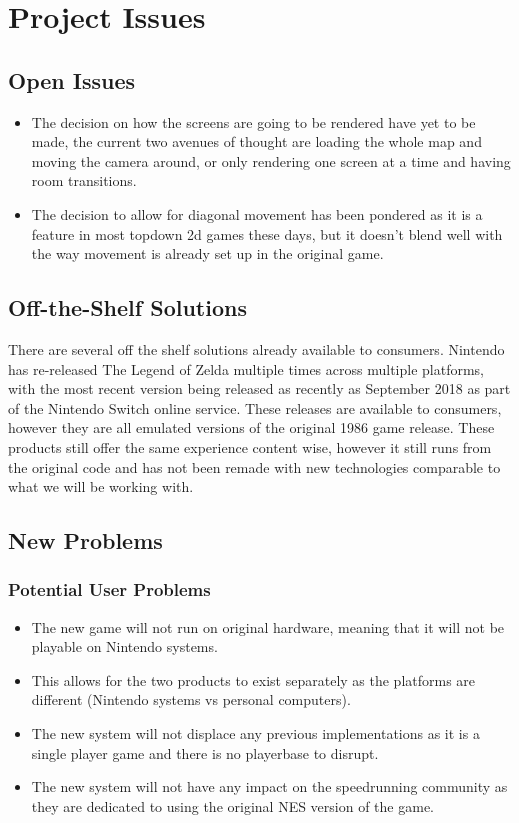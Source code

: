 \documentclass[12pt, titlepage]{article}
\begin{document}
\section{Project Issues}

\subsection{Open Issues}

\begin{itemize}
    \item The decision on how the screens are going to be rendered have yet to be made, the current two avenues of thought are loading the whole map and moving the camera around, or only rendering one screen at a time and having room transitions.
    \item The decision to allow for diagonal movement has been pondered as it is a feature in most topdown 2d games these days, but it doesn't blend well with the way movement is already set up in the original game.
\end{itemize}

\subsection{Off-the-Shelf Solutions} 

There are several off the shelf solutions already available to consumers. Nintendo has re-released The Legend of Zelda multiple times across multiple platforms, with the most recent version being released as recently as September 2018 as part of the Nintendo Switch online service. These releases are available to consumers, however they are all emulated versions of the original 1986 game release. These products still offer the same experience content wise, however it still runs from the original code and has not been remade with new technologies comparable to what we will be working with.

\subsection{New Problems}

\subsubsection{Potential User Problems}

\begin{itemize}
    \item The new game will not run on original hardware, meaning that it will not be playable on Nintendo systems.
    \item This allows for the two products to exist separately as the platforms are different (Nintendo systems vs personal computers).
    \item The new system will not displace any previous implementations as it is a single player game and there is no playerbase to disrupt.
    \item The new system will not have any impact on the speedrunning community as they are dedicated to using the original NES version of the game.
\end{itemize}
\end{document}
